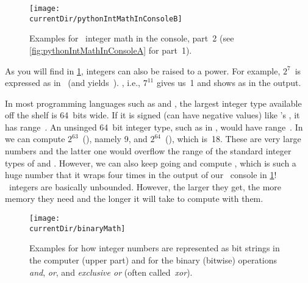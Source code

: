 \begin{figure}%
\centering%
\texttt{[image: \\currentDir/pythonIntMathInConsoleB]}%
\caption{Examples for \python\ integer math in the console, part~2 (see \cref{fig:pythonIntMathInConsoleA} for part~1).}%
\label{fig:pythonIntMathInConsoleB}%
\end{figure}%

As you will find in \cref{fig:pythonIntMathInConsoleB}, integers can also be raised to a power.
For example, $2^7$~is expressed as  in \python\ (and yields~).
, i.e., $7^{11}$ gives us~1 and shows as  in the output.

In most programming languages such as  and , the largest integer type available off the shelf is 64~bits wide.
If it is signed (can have negative values) like 's , it has range~.
An unsinged 64~bit integer type, such as  in , would have range~.
In \python\, we can compute $2^{63}$~(), namely 9, and
$2^{64}$~(), which is~18.
These are very large numbers and the latter one would overflow the range of the standard integer types of  and .
However, we can also keep going and compute , which is such a huge number that it wraps four times in the output of our \python\ console in \cref{fig:pythonIntMathInConsoleB}!
\python\ integers are basically unbounded.
However, the larger they get, the more memory they need and the longer it will take to compute with them.

\begin{figure}%
\centering%
\texttt{[image: \\currentDir/binaryMath]}%
\caption{Examples for how integer numbers are represented as bit strings in the computer (upper part) and for the binary (bitwise) operations \emph{and}, \emph{or}, and \emph{exclusive or} (often called~\emph{xor}).}%
\label{fig:binaryMath}%
\end{figure}

